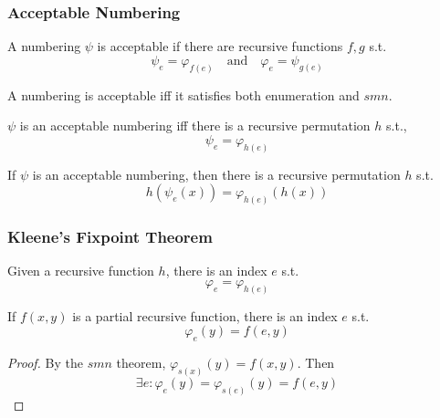 \documentclass[UTF8,aspectratio=43,11pt,colorlinks,compress,openany]{beamer}%
\begin{document}
\begin{frame}\frametitle{Acceptable Numbering}
	\begin{definition}
		A numbering $\psi$ is acceptable if there are recursive functions $f,g$ s.t.
	\setlength\abovedisplayskip{0pt}
	\setlength\belowdisplayskip{0pt}
		\[\psi_e=\varphi_{f(e)}\quad\text{and}\quad\varphi_e=\psi_{g(e)}\]
	\end{definition}
	\begin{theorem}
		A numbering is acceptable iff it satisfies both enumeration and $smn$.
	\end{theorem}	
	\begin{theorem}
		$\psi$ is an acceptable numbering iff there is a recursive permutation $h$ s.t.,
	\setlength\abovedisplayskip{0pt}
	\setlength\belowdisplayskip{0pt}
		\[\psi_e=\varphi_{h(e)}\]
	\end{theorem}
	\begin{theorem}[Blum]
		If $\psi$ is an acceptable numbering, then there is a recursive permutation $h$ s.t.
	\setlength\abovedisplayskip{0pt}
	\setlength\belowdisplayskip{0pt}
		\[h(\psi_e(x))=\varphi_{h(e)}(h(x))\]
	\end{theorem}
\end{frame}

\begin{frame}\frametitle{Kleene's Fixpoint Theorem}
\setlength\abovedisplayskip{0pt}
\setlength\belowdisplayskip{0pt}
	\begin{theorem}
		Given a recursive function $h$, there is an index $e$ s.t.
		\[\varphi_e=\varphi_{h(e)}\]
	\end{theorem}
	\begin{corollary}
		If $f(x,y)$ is a partial recursive function, there is an index $e$ s.t.
		\[\varphi_e(y)=f(e,y)\]
	\end{corollary}
	\begin{proof}
		By the $smn$ theorem, $\varphi_{s(x)}(y)=f(x,y)$. Then
		\[\exists e:\varphi_e(y)=\varphi_{s(e)}(y)=f(e,y)\]
	\end{proof}
\end{frame}
\end{document}
